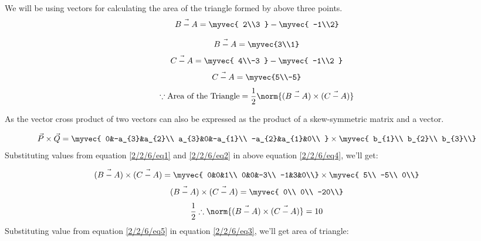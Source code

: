 We will be using vectors for calculating the area of the triangle formed by above three points.
%
\begin{align}
    \Vec{B-A} =\myvec{
    2\\3
    } -\myvec{
    -1\\2}
\end{align}
    
\begin{align} \label{2/2/6/eq1}
\Vec{B-A}= \myvec{3\\1}
\end{align}
\begin{align}
\Vec{C-A} =\myvec{
4\\-3
} -\myvec{
-1\\2 }
\end{align}
\begin{align} \label{2/2/6/eq2}
\Vec{C-A}= \myvec{5\\-5}
\end{align}
\begin{align} \label{2/2/6/eq3}
    \because
    \text{Area of the Triangle}  = \frac{1}{2}\norm {(\Vec{B-A})\times ( \Vec{C-A}) }
\end{align}
\newline

As the vector cross product of two vectors can also be expressed as the product of a skew-symmetric matrix and a vector.

\begin{align} \label{2/2/6/eq4}
    \Vec{P}\times  \Vec{Q}  = 
    \myvec{
    0&-a_{3}&a_{2}\\
    a_{3}&0&-a_{1}\\
    -a_{2}&a_{1}&0\\
    }
    \times \myvec{
    b_{1}\\
    b_{2}\\
    b_{3}\\}
\end{align}
Substituting values from equation \eqref{2/2/6/eq1} and \eqref{2/2/6/eq2} in above equation \eqref{2/2/6/eq4}, we'll get:

\begin{align}
    \Vec{(B-A)}\times  \Vec{(C-A)}  = 
    \myvec{
    0&0&1\\
    0&0&-3\\
   -1&3&0\\}
    \times \myvec{
    5\\
    -5\\
    0\\}
\end{align}
\begin{align} 
    \Vec{(B-A)}\times  \Vec{(C-A)}  = \myvec{
    0\\
    0\\
    -20\\}
\end{align}
\begin{align} \label{2/2/6/eq5}
\frac{1}{2}    \therefore \norm {\Vec{(B-A)}\times  \Vec{(C-A)} }  = 10
\end{align}
Substituting value from equation \eqref{2/2/6/eq5} in equation \eqref{2/2/6/eq3}, we'll get area of triangle:

